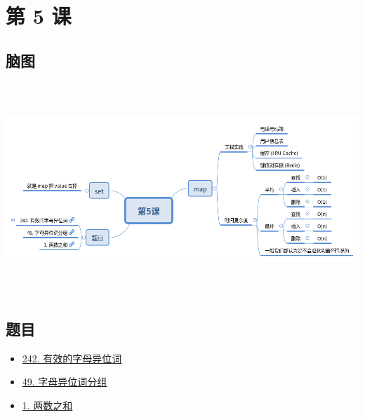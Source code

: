 \newpage
\section{第 5 课}

\subsection{脑图}

\includegraphics[width=170mm,height=80mm]{images/第5课.png}

\subsection{题目}

\begin{itemize}
\item \hyperref[leetcode:242]{242. 有效的字母异位词}
\item \hyperref[leetcode:49]{49. 字母异位词分组}
\item \hyperref[leetcode:1]{1. 两数之和}
\end{itemize}
